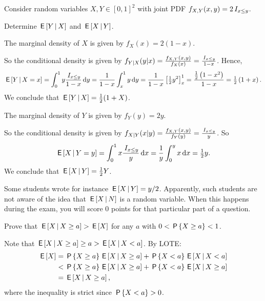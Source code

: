 \begin{exercise}
Consider random variables $X, Y \in [0,1]^2$ with joint PDF $f_{X,Y}(x,y) = 2 \1{x \leq y}$.

Determine $\E{Y \given X}$ and $\E{X \given Y}$.
\begin{solution}
The marginal density of $X$ is given by $f_X(x) = 2(1-x)$.

So the conditional density is given by $f_{Y|X}(y|x) = \frac{f_{X,Y}(x,y)}{f_X(x)} = \frac{\1{x \leq y}}{1-x}$. Hence,
\begin{equation*}
\E{Y \given X = x} = \int_0^1 y \frac{\1{x \leq y}}{1-x} \d y  = \frac1{1-x}  \int_x^1 y \d y = \frac1{1-x} \left[\tfrac12y^2\right]_x^1 = \frac{\tfrac12\left(1-x^2\right)}{1-x} =  \tfrac12 \left(1+x\right) .
\end{equation*}
We conclude that $\E{Y \given X} = \tfrac12(1+X)$.


The marginal density of $Y$ is given by $f_Y(y) = 2y$.

So the conditional density is given by $f_{X|Y}(x|y) = \frac{f_{X,Y}(x,y)}{f_Y(y)} = \frac{\1{x \leq y}}{y}$. So
\begin{equation*}
\E{X \given Y = y} = \int_0^1 x \frac{\1{x \leq y}}{y} \d x  = \frac1{y}   \int_0^y x \d x = \tfrac12 y.
\end{equation*}
We conclude that $\E{X \given Y} = \tfrac12Y$.

Some students wrote for instance $\E{X\given Y} = y/2$.
Apparently, such students are not aware of the idea that $\E{X\given N}$ is a random variable.
When this happens during the exam, you will score 0 points for that particular part of a question.

\end{solution}
\end{exercise}





\begin{exercise}
Prove that $\E{X \given X \geq a} > \E{X}$ for any $a$ with $0 < \P{X \geq a} < 1$.
\begin{solution}
Note that $\E{X \given X \geq a} \geq a > \E{X \given X < a}$. By LOTE:
\begin{align*}
\E{X} &= \P{X \geq a}  \E{X \given X \geq a} + \P{X <a}  \E{X \given X < a}
\\  &< \P{X \geq a}  \E{X \given X \geq a} + \P{X <a}  \E{X \given X \geq a}
\\  &= \E{X \given X \geq a},
\end{align*}
where the inequality is strict since $ \P{X <a} > 0$.
\end{solution}
\end{exercise}




